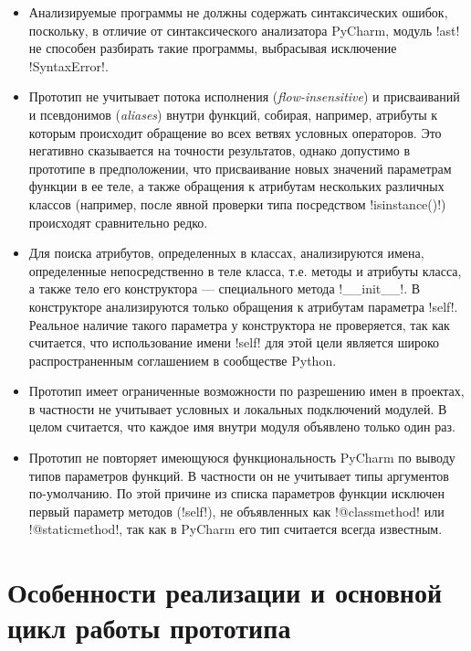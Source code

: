 \begin{itemize} 
  \item Анализируемые программы не должны содержать синтаксических ошибок,
    поскольку, в отличие от синтаксического анализатора PyCharm, модуль !ast! не
    способен разбирать такие программы, выбрасывая исключение !SyntaxError!.

  \item Прототип не учитывает потока исполнения (\emph{flow-insensitive}) и
    присваиваний и псевдонимов (\emph{aliases}) внутри функций, собирая, например,
    атрибуты к которым происходит обращение во всех ветвях условных операторов.
    Это негативно сказывается на точности результатов, однако допустимо в
    прототипе в предположении, что присваивание новых значений параметрам
    функции в ее теле, а также обращения к атрибутам нескольких различных
    классов (например, после явной проверки типа посредством !isinstance()!)
    происходят сравнительно редко.

  \item Для поиска атрибутов, определенных в классах, анализируются имена,
    определенные непосредственно в теле класса, т.е. методы и атрибуты
    класса, а также тело его конструктора --- специального метода !__init__!. В
    конструкторе анализируются только обращения к атрибутам параметра !self!.
    Реальное наличие такого параметра у конструктора не проверяется, так как
    считается, что использование имени !self! для этой цели является широко
    распространенным соглашением в сообществе Python.

  \item Прототип имеет ограниченные возможности по разрешению имен в проектах, в
    частности не учитывает условных и локальных подключений модулей. В целом
    считается, что каждое имя внутри модуля объявлено только один раз.

  \item Прототип не повторяет имеющуюся функциональность PyCharm по выводу
    типов параметров функций. В частности он не учитывает типы
    аргументов по-умолчанию. По этой причине из списка параметров функции
    исключен первый параметр методов (!self!), не объявленных как !@classmethod!
    или !@staticmethod!, так как в PyCharm его тип считается всегда известным.

\end{itemize}



\section{Особенности реализации и основной цикл работы прототипа}
\label{sec:prototype-architecture}

